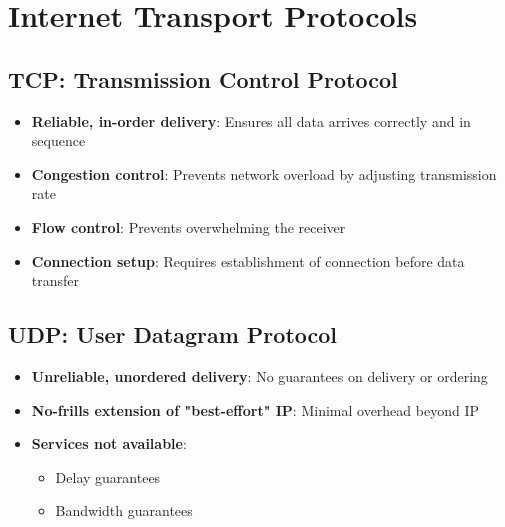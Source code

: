 \documentclass[12pt]{article}
\begin{document}
\section{Internet Transport Protocols}

\subsection{TCP: Transmission Control Protocol}
\begin{itemize}
    \item \textbf{Reliable, in-order delivery}: Ensures all data arrives correctly and in sequence
    \item \textbf{Congestion control}: Prevents network overload by adjusting transmission rate
    \item \textbf{Flow control}: Prevents overwhelming the receiver
    \item \textbf{Connection setup}: Requires establishment of connection before data transfer
\end{itemize}

\subsection{UDP: User Datagram Protocol}
\begin{itemize}
    \item \textbf{Unreliable, unordered delivery}: No guarantees on delivery or ordering
    \item \textbf{No-frills extension of "best-effort" IP}: Minimal overhead beyond IP
    \item \textbf{Services not available}:
          \begin{itemize}
              \item Delay guarantees
              \item Bandwidth guarantees
          \end{itemize}
\end{itemize}
\end{document}
